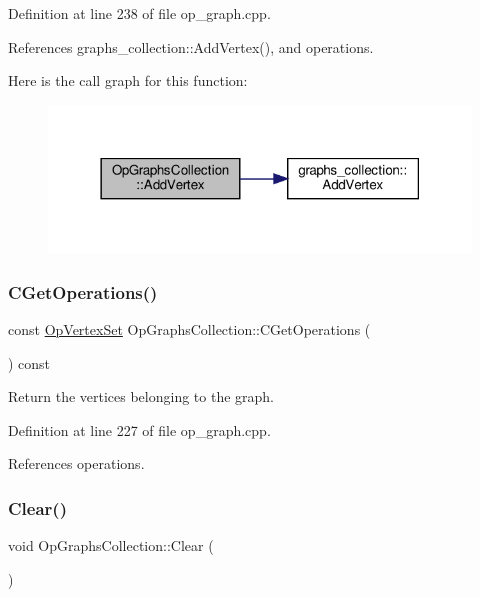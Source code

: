 Definition at line 238 of file op\+\_\+graph.\+cpp.



References graphs\+\_\+collection\+::\+Add\+Vertex(), and operations.

Here is the call graph for this function\+:
\nopagebreak
\begin{figure}[H]
\begin{center}
\leavevmode
\includegraphics[width=318pt]{da/df9/classOpGraphsCollection_afbe13994e2c675945ff79b4bf01163fd_cgraph}
\end{center}
\end{figure}
\mbox{\label{classOpGraphsCollection_a625d45ef62e1f99746251575b18c1519}} 
\subsubsection{\texorpdfstring{C\+Get\+Operations()}{CGetOperations()}}
{\footnotesize\ttfamily const \hyperlink{classOpVertexSet}{Op\+Vertex\+Set} Op\+Graphs\+Collection\+::\+C\+Get\+Operations (\begin{DoxyParamCaption}{ }\end{DoxyParamCaption}) const}



Return the vertices belonging to the graph. 



Definition at line 227 of file op\+\_\+graph.\+cpp.



References operations.

\mbox{\label{classOpGraphsCollection_a625992dd75b06e471812a41fbcd4502c}} 
\subsubsection{\texorpdfstring{Clear()}{Clear()}}
{\footnotesize\ttfamily void Op\+Graphs\+Collection\+::\+Clear (\begin{DoxyParamCaption}{ }\end{DoxyParamCaption})}



